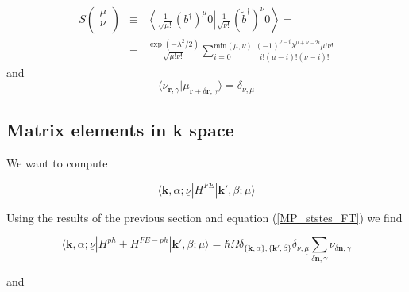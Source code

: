 \documentclass[pt12]{article}
\newcommand{\bfk}{\mathbf{k}}
\newcommand{\bfr}{\mathbf{r}}
\newcommand{\bfn}{\mathbf{n}}
\begin{document}
\begin{eqnarray}\label{S_def}
S\left(
                                \begin{array}{c}
                                    \mu \\
                                    \nu \\
                                  \end{array}
                                \right) &\equiv&
\left\langle \frac{1}{\sqrt{\mu !}}(b^\dagger)^\mu 0 \right|
\left.\frac{1}{\sqrt{\nu !}}(\tilde{b}^\dagger)^\nu 0 \right\rangle =\\
&=&
\frac{\exp(-\lambda^2/2)}{\sqrt{\mu!\nu!}}\sum_{i=0}^{\textrm{min}(\mu,\nu)}
\frac{(-1)^{\nu-i}\lambda^{\mu+\nu-2i}\mu!\nu!}{i!(\mu-i)!(\nu-i)!}
\end{eqnarray}
and
\begin{equation}\label{Ground_Vibrational_overlap}
\langle \nu_{\bfr,\gamma}|\mu_{\bfr+\delta\bfr,\gamma}
\rangle=\delta_{\nu,\mu}
\end{equation}



\subsection{Matrix elements in \textbf{k} space}

We want to compute

\begin{equation}\label{Matrix_elements_def_FT}
\langle \bfk,\alpha ; \underline{\nu} | H^{FE} | \bfk',\beta ;
\underline{\mu} \rangle
\end{equation}

Using the results  of the previous section and equation
(\ref{MP_ststes_FT}) we find

\begin{equation}\label{Matrix_elements_ph_FT}
\langle \bfk,\alpha ; \underline{\nu} | H^{ph}+H^{FE-ph} |
\bfk',\beta ; \underline{\mu} \rangle = \hbar \Omega
\delta_{\{\bfk,\alpha\},\{\bfk',\beta\}} \delta_{\underline{\nu},
\underline{\mu}} \sum_{\delta\bfn,\gamma} \nu_{\delta\bfn,\gamma}
\end{equation}

and
\end{document}
